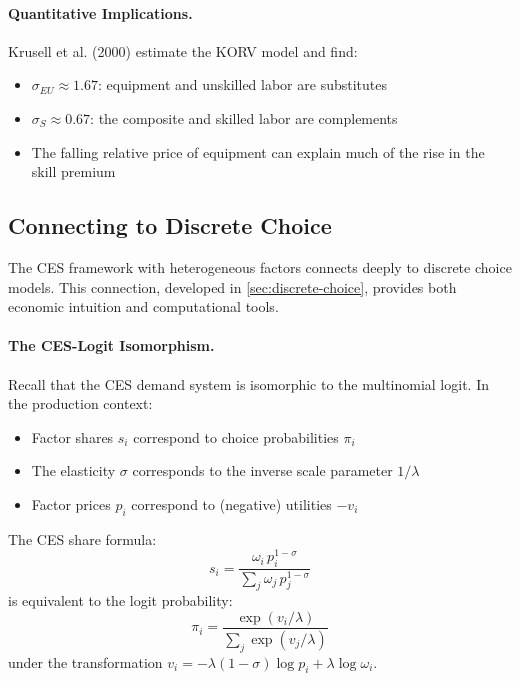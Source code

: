 \paragraph{Quantitative Implications.}
Krusell et al. (2000) estimate the KORV model and find:
\begin{itemize}[nosep]
\item $\sigma_{EU} \approx 1.67$: equipment and unskilled labor are substitutes
\item $\sigma_S \approx 0.67$: the composite and skilled labor are complements
\item The falling relative price of equipment can explain much of the rise in the skill premium
\end{itemize}

\subsection{Connecting to Discrete Choice}
\label{subsec:discrete-choice-connection}

The CES framework with heterogeneous factors connects deeply to discrete choice models. This connection, developed in \cref{sec:discrete-choice}, provides both economic intuition and computational tools.

\paragraph{The CES-Logit Isomorphism.}
Recall that the CES demand system is isomorphic to the multinomial logit. In the production context:
\begin{itemize}[nosep]
\item Factor shares $s_i$ correspond to choice probabilities $\pi_i$
\item The elasticity $\sigma$ corresponds to the inverse scale parameter $1/\lambda$
\item Factor prices $p_i$ correspond to (negative) utilities $-v_i$
\end{itemize}

The CES share formula:
\begin{equation}
s_i = \frac{\omega_i \, p_i^{1-\sigma}}{\sum_j \omega_j \, p_j^{1-\sigma}}
\label{eq:ces-share}
\end{equation}
is equivalent to the logit probability:
\begin{equation}
\pi_i = \frac{\exp(v_i / \lambda)}{\sum_j \exp(v_j / \lambda)}
\label{eq:logit-prob}
\end{equation}
under the transformation $v_i = -\lambda(1-\sigma) \log p_i + \lambda \log \omega_i$.

